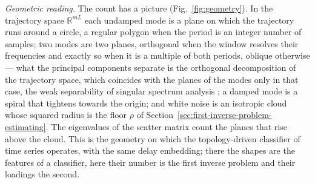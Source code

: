 \documentclass{article}
\begin{document}
\emph{Geometric reading.} The count has a picture (Fig.~\ref{fig:geometry}). In the trajectory space $\mathbb{R}^{mL}$ each undamped mode is a plane on which the trajectory runs around a circle, a regular polygon when the period is an integer number of samples; two modes are two planes, orthogonal when the window resolves their frequencies and exactly so when it is a multiple of both periods, oblique otherwise --- what the principal components separate is the orthogonal decomposition of the trajectory space, which coincides with the planes of the modes only in that case, the weak separability of singular spectrum analysis \cite{ref-Golyandina04}; a damped mode is a spiral that tightens towards the origin; and white noise is an isotropic cloud whose squared radius is the floor $\rho$ of Section~\ref{sec:first-inverse-problem-estimating}. The eigenvalues of the scatter matrix count the planes that rise above the cloud. This is the geometry on which the topology-driven classifier of time series \cite{ref-Bernadotte10} operates, with the same delay embedding; there the shapes are the features of a classifier, here their number is the first inverse problem and their loadings the second. 
\end{document}
